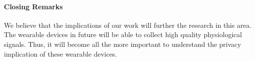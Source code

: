 \paragraph{Closing Remarks} We believe that the implications of our work will further the research in this area. The wearable devices in future will be able to collect high quality physiological signals. Thus, it will become all the more important to understand the privacy implication of these wearable devices. 
